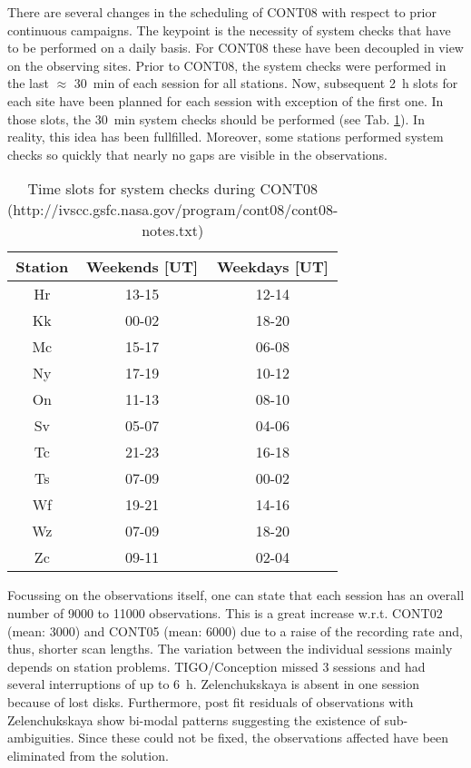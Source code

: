 \documentclass[natbib,twocolumn,twoside]{svmultiag}
\begin{document}
There are several changes in the scheduling of CONT08 with respect to prior
continuous campaigns.
The keypoint is the necessity of system checks that have to be performed on a
daily basis.
For CONT08 these have been decoupled in view on the observing sites.
Prior to CONT08, the system checks were performed in the last $\approx$ 30~min
of each session for all stations.
Now, subsequent 2~h slots for each site have been planned for each session
with exception of the first one.
In those slots, the 30~min system checks should be performed (see Tab. 
\ref{tab:slots}).
In reality, this idea has been fullfilled.
Moreover, some stations performed system checks so quickly that nearly no
gaps are visible in the observations.
\begin{table}[t]
 \centering
 \begin{tabular}{c||c|c}
    Station & Weekends [UT] & Weekdays [UT] \\ 
    \hline
    Hr  & 13-15& 12-14\\
    Kk  & 00-02& 18-20\\
    Mc  & 15-17& 06-08\\
    Ny  & 17-19& 10-12\\
    On  & 11-13& 08-10\\
    Sv  & 05-07& 04-06\\
    Tc  & 21-23& 16-18\\
    Ts  & 07-09& 00-02\\
    Wf  & 19-21& 14-16\\
    Wz  & 07-09& 18-20\\
    Zc  & 09-11& 02-04
 \end{tabular}
 \caption{Time slots for system checks during CONT08
          (http://ivscc.gsfc.nasa.gov/program/cont08/cont08-notes.txt)}
 \label{tab:slots}
\end{table}

Focussing on the observations itself, one can state that each session has an
overall number of 9000 to 11000 observations.
This is a great increase w.r.t. CONT02 (mean: 3000) and CONT05 (mean: 6000)
due to a raise of the recording rate and, thus, shorter scan lengths.
The variation between the individual sessions mainly depends on station
problems.
TIGO/Conception missed 3 sessions and had several interruptions of up to 6~h.
Zelenchukskaya is absent in one session because of lost disks. 
Furthermore, post fit residuals of observations with Zelenchukskaya show 
bi-modal patterns suggesting the existence of sub-ambiguities. 
Since these could not be fixed, the observations affected have been
eliminated from the solution.
\end{document}
